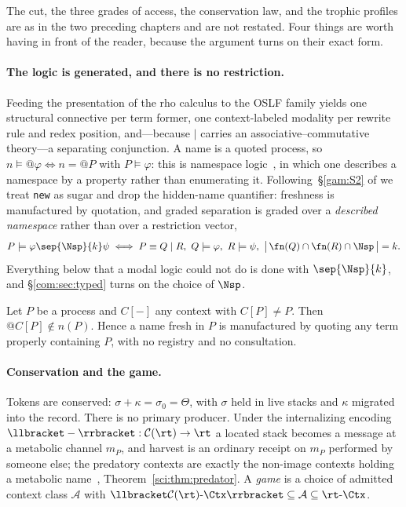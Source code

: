 The cut, the three grades of access, the conservation law, and the trophic
profiles are as in the two preceding chapters and are not restated. Four things
are worth having in front of the reader, because the argument turns on their
exact form.

\paragraph{The logic is generated, and there is no restriction.}
Feeding the presentation of the rho calculus to the OSLF family yields one structural connective
per term former, one context-labeled modality per rewrite rule and redex position, and---because
$\mid$ carries an associative--commutative theory---a separating conjunction. A name is a quoted
process, so $n \models @\varphi \iff n = @P$ with $P \models \varphi$: this is namespace
logic~\cite{NamespaceLogic}, in which one describes a namespace by a property rather than enumerating
it. Following~\S\ref{gam:S2} of \chGame we treat \texttt{new} as sugar and drop the hidden-name
quantifier: freshness is manufactured by quotation, and graded separation is graded over a
\emph{described namespace} rather than over a restriction vector,
\[
  P \models \varphi \sep{\Nsp}{k} \psi
  \iff
  P \equiv Q \mid R,\ Q \models \varphi,\ R \models \psi,\
  \bigl|\, \fn(Q) \cap \fn(R) \cap \Nsp \,\bigr| = k .
\]
Everything below that a modal logic could not do is done with $\sep{\Nsp}{k}$, and
\S\ref{com:sec:typed} turns on the choice of $\Nsp$.

\begin{proposition}\label{com:prop:fresh}
Let $P$ be a process and $C[-]$ any context with $C[P] \neq P$. Then $@C[P] \notin n(P)$. Hence a
name fresh in $P$ is manufactured by quoting any term properly containing $P$, with no registry
and no consultation.
\end{proposition}

\paragraph{Conservation and the game.}
Tokens are conserved: $\sigma + \kappa = \sigma_0 = \Theta$, with $\sigma$ held in live stacks
and $\kappa$ migrated into the record. There is no primary producer. Under the internalizing
encoding $\llbracket - \rrbracket : \mathcal{C}(\rt) \to \rt$ a located stack becomes a message
at a metabolic channel $m_P$, and harvest is an ordinary receipt on $m_P$ performed by someone
else; the predatory contexts are exactly the non-image contexts holding a metabolic
name~\chSci, Theorem~\ref{sci:thm:predator}. A \emph{game} is a choice of admitted context class $\mathcal{A}$
with $\llbracket \mathcal{C}(\rt)\text{-}\Ctx \rrbracket \subseteq \mathcal{A} \subseteq
\rt\text{-}\Ctx$.

